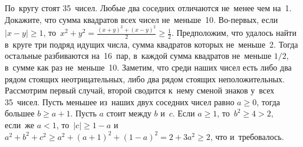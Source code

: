 \problem{}
По~кругу стоят 35~чисел.
Любые два соседних отличаются не~менее чем на~1.
Докажите, что сумма квадратов всех чисел не~меньше~10.
\solution
Во-первых, если $|x - y| \geq 1$,
то~$x^2 + y^2 = \frac{(x + y)^2 + (x - y)^2}{2} \geq \frac{1}{2}$.
Предположим, что удалось найти в~круге три подряд идущих числа, сумма квадратов
которых не~меньше~2.
Тогда остальные разбиваются на~16~пар, в~каждой сумма квадратов не~меньше
$1/2$, в~сумме как раз не~меньше~10.
Заметим, что среди наших чисел есть либо два рядом стоящих неотрицательных,
либо два рядом стоящих неположительных.
Рассмотрим первый случай, второй сводится к~нему сменой знаков у~всех 35~чисел.
Пусть меньшее из~наших двух соседних чисел равно $a \geq 0$, тогда большее
$b \geq a + 1$.
Пусть $a$ стоит между $b$ и~$c$.
Если $a \geq 1$, то~$b^2 \geq 4 > 2$, если~же $a < 1$, то~$|c| \geq 1 - a$
и~\(
    a^2 + b^2 + c^2
\geq
    a^2 + (a + 1)^2 + (1 - a)^2
=
    2 + 3 a^2 \geq 2
\),
что и~требовалось.
\endproblem

